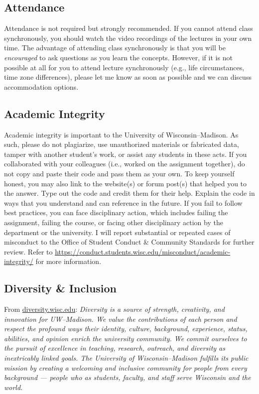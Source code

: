 \documentclass[11pt,]{article}
\begin{document}
\hypertarget{attendance}{%
\subsection{Attendance}\label{attendance}}

Attendance is not required but strongly recommended. If you cannot
attend class synchronously, you should watch the video recordings of the
lectures in your own time. The advantage of attending class
synchronously is that you will be \emph{encouraged} to ask questions as
you learn the concepts. However, if it is not possible at all for you to
attend lecture synchronously (e.g., life circumstances, time zone
differences), please let me know as soon as possible and we can discuss
accommodation options.

\hypertarget{academic-integrity}{%
\subsection{Academic Integrity}\label{academic-integrity}}

Academic integrity is important to the University of Wisconsin--Madison.
As such, please do not plagiarize, use unauthorized materials or
fabricated data, tamper with another student's work, or assist any
students in these acts. If you collaborated with your colleagues (i.e.,
worked on the assignment together), do not copy and paste their code and
pass them as your own. To keep yourself honest, you may also link to the
website(s) or forum post(s) that helped you to the answer. Type out the
code and credit them for their help. Explain the code in ways that you
understand and can reference in the future. If you fail to follow best
practices, you can face disciplinary action, which includes failing the
assignment, failing the course, or facing other disciplinary action by
the department or the university. I will report substantial or repeated
cases of misconduct to the Office of Student Conduct \& Community
Standards for further review. Refer to
\url{https://conduct.students.wisc.edu/misconduct/academic-integrity/}
for more information.

\hypertarget{diversity-inclusion}{%
\subsection{Diversity \& Inclusion}\label{diversity-inclusion}}

From \href{https://diversity.wisc.edu/}{diversity.wisc.edu}:
\emph{Diversity is a source of strength, creativity, and innovation for
UW--Madison. We value the contributions of each person and respect the
profound ways their identity, culture, background, experience, status,
abilities, and opinion enrich the university community. We commit
ourselves to the pursuit of excellence in teaching, research, outreach,
and diversity as inextricably linked goals. The University of
Wisconsin--Madison fulfills its public mission by creating a welcoming
and inclusive community for people from every background --- people who
as students, faculty, and staff serve Wisconsin and the world.}
\end{document}
